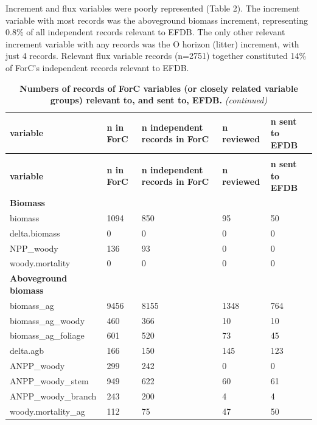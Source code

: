 \documentclass[, manuscript]{copernicus}
\begin{document}
Increment and flux variables were poorly represented (Table 2). The
increment variable with most records was the aboveground biomass
increment, representing 0.8\% of all independent records relevant to
EFDB. The only other relevant increment variable with any records was
the O horizon (litter) increment, with just 4 records. Relevant flux
variable records (n=2751) together constituted 14\% of ForC's
independent records relevant to EFDB.

\newpage
\begingroup\fontsize{8}{10}\selectfont

\begin{longtable}[t]{l|l|l|l|l}
\caption{\label{tab:table_variables}\textbf{Numbers of records of ForC variables (or closely related variable groups) relevant to, and sent to, EFDB.}}\\
\hline
\textbf{variable} & \textbf{n in ForC} & \textbf{n independent records in ForC} & \textbf{n reviewed} & \textbf{n sent to EFDB}\\
\hline
\endfirsthead
\caption[]{\textbf{Numbers of records of ForC variables (or closely related variable groups) relevant to, and sent to, EFDB.} \textit{(continued)}}\\
\hline
\textbf{variable} & \textbf{n in ForC} & \textbf{n independent records in ForC} & \textbf{n reviewed} & \textbf{n sent to EFDB}\\
\hline
\endhead
\textbf{Biomass} & \textbf{} & \textbf{} & \textbf{} & \textbf{}\\
\hline
biomass & 1094 & 850 & 95 & 50\\
\hline
delta.biomass & 0 & 0 & 0 & 0\\
\hline
NPP\_woody & 136 & 93 & 0 & 0\\
\hline
woody.mortality & 0 & 0 & 0 & 0\\
\hline
\textbf{Aboveground biomass} & \textbf{} & \textbf{} & \textbf{} & \textbf{}\\
\hline
biomass\_ag & 9456 & 8155 & 1348 & 764\\
\hline
biomass\_ag\_woody & 460 & 366 & 10 & 10\\
\hline
biomass\_ag\_foliage & 601 & 520 & 73 & 45\\
\hline
delta.agb & 166 & 150 & 145 & 123\\
\hline
ANPP\_woody & 299 & 242 & 0 & 0\\
\hline
ANPP\_woody\_stem & 949 & 622 & 60 & 61\\
\hline
ANPP\_woody\_branch & 243 & 200 & 4 & 4\\
\hline
woody.mortality\_ag & 112 & 75 & 47 & 50\\

\end{longtable}
\end{document}
